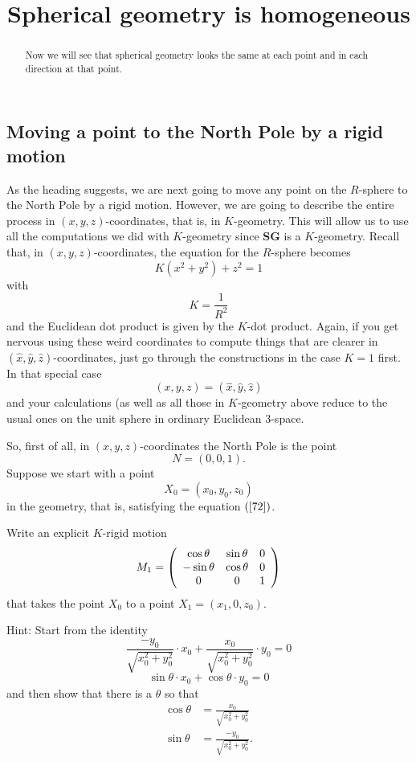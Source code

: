 \documentclass{ximera}
\title{Spherical geometry is homogeneous}
\begin{document}
\begin{abstract}
Now we will see that spherical geometry looks the same at each point
and in each direction at that point.
\end{abstract}
\maketitle



\subsection*{Moving a point to the North Pole by a rigid motion}

As the heading suggests, we are next going to move any point on the
$R$-sphere to the North Pole by a rigid motion. However, we are going
to describe the entire process in $\left( x,y,z\right) $-coordinates,
that is, in $K$-geometry. This will allow us to use all the
computations we did with $K$-geometry since \textbf{SG} is a
$K$-geometry.  Recall that, in $\left( x,y,z\right) $-coordinates, the
equation for the $R$-sphere becomes%
\begin{equation}
K\left(  x^{2}+y^{2}\right)  +z^{2}=1 \label{72}%
\end{equation}
with%
\[
K=\frac{1}{R^{2}}%
\]
and the Euclidean dot product is given by the $K$-dot product. Again, if you
get nervous using these weird coordinates to compute things that are clearer
in $\left(  \hat{x},\hat{y},\hat{z}\right)  $-coordinates, just go through the
constructions in the case $K=1$ first. In that special case
\[
\left(  x,y,z\right)  =\left(  \hat{x},\hat{y},\hat{z}\right)
\]
and your calculations (as well as all those in $K$-geometry above reduce to
the usual ones on the unit sphere in ordinary Euclidean $3$-space.

So, first of all, in $\left(  x,y,z\right)  $-coordinates the North Pole is
the point%
\[
N=\left(  0,0,1\right)  .
\]
Suppose we start with a point%
\[
X_{0}=\left(  x_{0},y_{0},z_{0}\right)
\]
in the geometry, that is, satisfying the equation $\left(  \ref{72}\right)  $.

\begin{exercise}
 Write an explicit $K$-rigid motion%
\[
M_{1}=\left(
\begin{array}
[c]{ccc}%
\cos\theta & \sin \theta & 0\\
-\sin \theta & \cos\theta & 0\\
0 & 0 & 1
\end{array}
\right)
\]
that takes the point $X_{0}$ to a point $X_{1}=\left(  x_{1},0,z_{0}\right)  $.

Hint: Start from the identity%
\[
\frac{-y_{0}}{\sqrt{x_{0}^{2}+y_{0}^{2}}}\cdot x_{0}%
+\frac{x_{0}}{\sqrt{x_{0}^{2}+y_{0}^{2}}}\cdot y_{0}=0
\]%
\[
\sin \theta\cdot x_{0}+\cos\theta
\cdot y_{0}=0
\]
and then show that there is a $\theta$ so that%
\begin{align*}
\cos\theta &  =\frac{x_{0}}{\sqrt{x_{0}^{2}+y_{0}^{2}}}\\
\sin \theta &  =\frac{-y_{0}}{\sqrt{x_{0}^{2}+y_{0}^{2}}}.
\end{align*}

\end{exercise}
\end{document}
